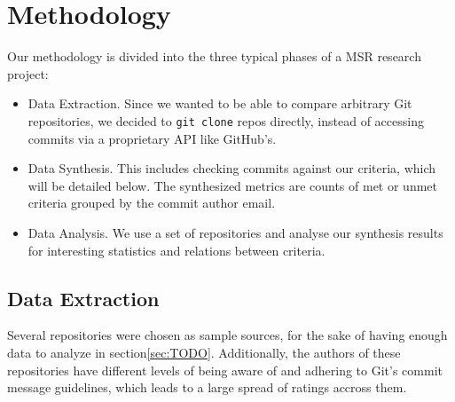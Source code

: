 \section{Methodology}
\label{sec:methodology}

Our methodology is divided into the three typical phases of a MSR research project:


\begin{itemize}
  \item Data Extraction. Since we wanted to be able to compare arbitrary Git repositories, we decided to \texttt{git clone} repos directly, instead of accessing commits via a proprietary API like GitHub's.
  \item Data Synthesis. This includes checking commits against our criteria, which will be detailed below. The synthesized metrics are counts of met or unmet criteria grouped by the commit author email.
  \item Data Analysis. We use a set of repositories and analyse our synthesis results for interesting statistics and relations between criteria.
\end{itemize}


\subsection{Data Extraction}

Several repositories were chosen as sample sources, for the sake of having enough data to analyze in section\ref{sec:TODO}. Additionally, the authors of these repositories have different levels of being aware of and adhering to Git's commit message guidelines\cite{OffGuide}, which leads to a large spread of ratings accross them.


